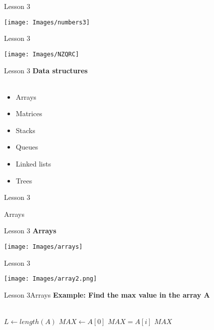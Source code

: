 \documentclass[aspectratio=1610]{beamer}
\begin{document}
\begin{frame}{Lesson 3}{}
\begin{center}
\texttt{[image: Images/numbers3]}
\end{center}
\end{frame}


\begin{frame}{Lesson 3}{}
\begin{center}
\texttt{[image: Images/NZQRC]}
\end{center}
\end{frame}



\begin{frame}{Lesson 3}{}
\LARGE
\textbf{Data structures}\\~\\
\begin{itemize}
    \item Arrays
    \item Matrices
    \item Stacks
    \item Queues
    \item Linked lists
    \item Trees
\end{itemize}
\end{frame}


\begin{frame}{Lesson 3}{}
\begin{center}
\Huge Arrays
\end{center}
\end{frame}

\begin{frame}{Lesson 3}{}
\LARGE
\textbf{Arrays}
\begin{center}
\texttt{[image: Images/arrays]}
\end{center}
\end{frame}


\begin{frame}{Lesson 3}{}
\begin{center}
\texttt{[image: Images/array2.png]}
\end{center}
\end{frame}



\begin{frame}{Lesson 3}{Arrays}
\Large
\textbf{Example: Find the max value in the array A}\\~\\


\label{MaxArray}
\begin{algorithmic}[1]
 
\State $L\gets length(A)$
\State $MAX\gets A[0]$
    \State \textbf{$MAX = A[i]$} 
\EndIf
\EndFor
\State \Return $MAX$
\EndProcedure
\end{algorithmic}
\end{frame}
\end{document}
